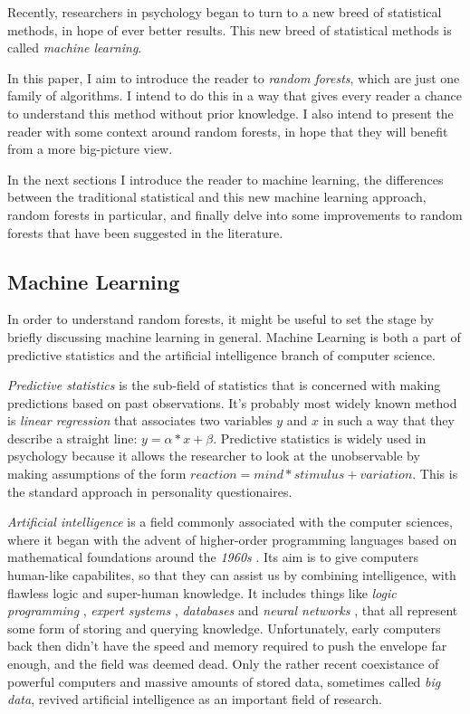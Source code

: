 \documentclass[a4paper,man,12pt,apacite,floatsintext,draftfirst]{apa6} %
\begin{document}
Recently, researchers in psychology began to turn to a new breed of
statistical methods, in hope of ever better results. This new breed of
statistical methods is called \emph{machine learning}.

In this paper, I aim to introduce the reader to \emph{random forests},
which are just one family of algorithms.
I intend to do this in a way that gives every reader a chance to understand
this method without prior knowledge. I also intend to present the reader
with some context around random forests, in hope that they will benefit
from a more big-picture view.

In the next sections I introduce the reader to machine learning,
the differences between the traditional statistical and this new
machine learning approach, random forests in particular, and finally delve
into some improvements to random forests that have been suggested in the
literature.

\subsection{Machine Learning}
In order to understand random forests, it might be useful to set
the stage by briefly discussing machine learning in general.
Machine Learning is both a part of predictive statistics and the
artificial intelligence branch of computer science.

\emph{Predictive statistics} is the sub-field of statistics that is
concerned with making predictions based on past observations.
It's probably most widely known method is \emph{linear regression}
\cite{wpLR} that associates two variables \(y\) and \(x\) in such a way
that they describe a straight line: \(y = \alpha * x + \beta \).
Predictive statistics is widely used in psychology because it
allows the researcher to look at the unobservable by making
assumptions of the form \(reaction = mind * stimulus + variation\).
This is the standard approach in personality questionaires.

\emph{Artificial intelligence} is a field commonly associated with the
computer sciences, where it began with the advent of higher-order
programming languages based on mathematical foundations around the \emph{1960s} \cite{wpHOPL}.
Its aim is to give computers human-like capabilites, so that they can assist
us by combining intelligence, with flawless logic and super-human knowledge.
It includes things like \emph{logic programming} \cite{wpLP},
\emph{expert systems} \cite{wpES}, \emph{databases} \cite{wpDB} and
\emph{neural networks} \cite{wpNN}, that all represent some form of
storing and querying knowledge.
Unfortunately, early computers back then didn't have the speed and memory
required to push the envelope far enough, and the field was deemed dead.
Only the rather recent coexistance of powerful computers and massive amounts
of stored data, sometimes called \emph{big data}, revived artificial
intelligence as an important field of research.
\end{document}
